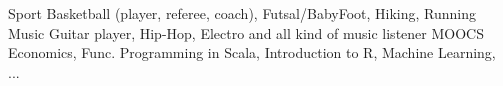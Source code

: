 \begin{cvhonors}
  \cvhonor
    {Sport}
    {Basketball (player, referee, coach), Futsal/BabyFoot, Hiking, Running}
    {}
    {\faFutbolO}
  \cvhonor
    {Music}
    {Guitar player, Hip-Hop, Electro and all kind of music listener}
    {}
    {\faMusic}
  \cvhonor
    {MOOCS}
    {Economics, Func. Programming in Scala, Introduction to R, Machine Learning, ...}
    {}
    {\faGraduationCap}
\end{cvhonors}